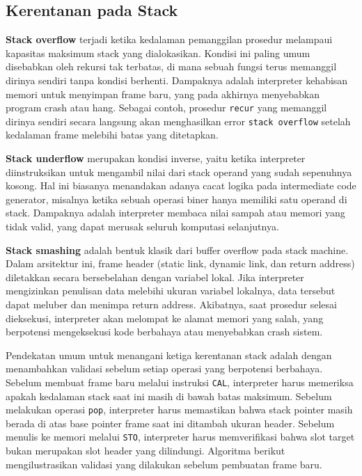 \subsection{Kerentanan pada Stack}

\textbf{Stack overflow} terjadi ketika kedalaman pemanggilan prosedur melampaui kapasitas maksimum stack yang dialokasikan. Kondisi ini paling umum disebabkan oleh rekursi tak terbatas, di mana sebuah fungsi terus memanggil dirinya sendiri tanpa kondisi berhenti. Dampaknya adalah interpreter kehabisan memori untuk menyimpan frame baru, yang pada akhirnya menyebabkan program crash atau hang. Sebagai contoh, prosedur \texttt{recur} yang memanggil dirinya sendiri secara langsung akan menghasilkan error \texttt{stack overflow} setelah kedalaman frame melebihi batas yang ditetapkan.

\textbf{Stack underflow} merupakan kondisi inverse, yaitu ketika interpreter diinstruksikan untuk mengambil nilai dari stack operand yang sudah sepenuhnya kosong. Hal ini biasanya menandakan adanya cacat logika pada intermediate code generator, misalnya ketika sebuah operasi biner hanya memiliki satu operand di stack. Dampaknya adalah interpreter membaca nilai sampah atau memori yang tidak valid, yang dapat merusak seluruh komputasi selanjutnya.

\textbf{Stack smashing} adalah bentuk klasik dari buffer overflow pada stack machine. Dalam arsitektur ini, frame header (static link, dynamic link, dan return address) diletakkan secara bersebelahan dengan variabel lokal. Jika interpreter mengizinkan penulisan data melebihi ukuran variabel lokalnya, data tersebut dapat meluber dan menimpa return address. Akibatnya, saat prosedur selesai dieksekusi, interpreter akan melompat ke alamat memori yang salah, yang berpotensi mengeksekusi kode berbahaya atau menyebabkan crash sistem.

Pendekatan umum untuk menangani ketiga kerentanan stack adalah dengan menambahkan validasi sebelum setiap operasi yang berpotensi berbahaya. Sebelum membuat frame baru melalui instruksi \texttt{CAL}, interpreter harus memeriksa apakah kedalaman stack saat ini masih di bawah batas maksimum. Sebelum melakukan operasi \texttt{pop}, interpreter harus memastikan bahwa stack pointer masih berada di atas base pointer frame saat ini ditambah ukuran header. Sebelum menulis ke memori melalui \texttt{STO}, interpreter harus memverifikasi bahwa slot target bukan merupakan slot header yang dilindungi. Algoritma berikut mengilustrasikan validasi yang dilakukan sebelum pembuatan frame baru.

